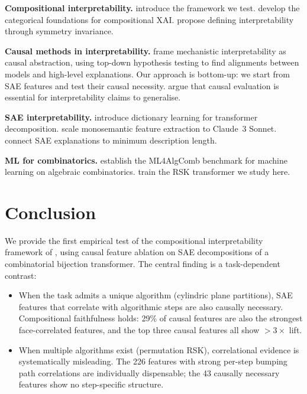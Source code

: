 \documentclass[10pt]{article}
\begin{document}
\textbf{Compositional interpretability.}
\citet{gauderis2026} introduce the framework we test.
\citet{tull2024} develop the categorical foundations for compositional XAI.
\citet{barbiero2025} propose defining interpretability through symmetry
invariance.

\textbf{Causal methods in interpretability.}
\citet{geiger2025} frame mechanistic interpretability as causal abstraction,
using top-down hypothesis testing to find alignments between models and
high-level explanations. Our approach is bottom-up: we start from SAE
features and test their causal necessity.
\citet{joshi2026} argue that causal evaluation is essential for
interpretability claims to generalise.

\textbf{SAE interpretability.}
\citet{bricken2023} introduce dictionary learning for transformer
decomposition.
\citet{templeton2024} scale monosemantic feature extraction to Claude~3
Sonnet. \citet{braun2025} connect SAE explanations to minimum description
length.

\textbf{ML for combinatorics.}
\citet{kvinge2025} establish the ML4AlgComb benchmark for machine learning
on algebraic combinatorics. \citet{langer2026rsk} train the RSK transformer
we study here.

\section{Conclusion}

We provide the first empirical test of the compositional interpretability
framework of \citet{gauderis2026}, using causal feature ablation on SAE
decompositions of a combinatorial bijection transformer. The central finding
is a task-dependent contrast:

\begin{itemize}
\item When the task admits a unique algorithm (cylindric plane partitions),
SAE features that correlate with algorithmic steps are also causally
necessary. Compositional faithfulness holds: 29\% of causal features are
also the strongest face-correlated features, and the top three causal
features all show $>3\times$ lift.

\item When multiple algorithms exist (permutation RSK), correlational
evidence is systematically misleading. The 226 features with strong per-step
bumping path correlations are individually dispensable; the 43 causally
necessary features show no step-specific structure.
\end{itemize}
\end{document}
